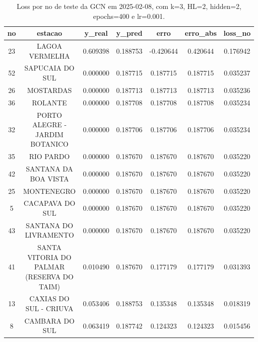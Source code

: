 \begin{table}[h]
\centering
\caption{Loss por no de teste da GCN em 2025-02-08, com k=3, HL=2, hidden=2, epochs=400 e lr=0.001.}
\label{tab:gcn_loss_k3_hl2_h2_e400_d20250208}
\begin{tabular}{ccccccc}
\toprule
no & estacao & y\_real & y\_pred & erro & erro\_abs & loss\_no \\
\midrule
23 & LAGOA VERMELHA & 0.609398 & 0.188753 & -0.420644 & 0.420644 & 0.176942 \\
52 & SAPUCAIA DO SUL & 0.000000 & 0.187715 & 0.187715 & 0.187715 & 0.035237 \\
26 & MOSTARDAS & 0.000000 & 0.187713 & 0.187713 & 0.187713 & 0.035236 \\
36 & ROLANTE & 0.000000 & 0.187708 & 0.187708 & 0.187708 & 0.035234 \\
32 & PORTO ALEGRE - JARDIM BOTANICO & 0.000000 & 0.187706 & 0.187706 & 0.187706 & 0.035234 \\
35 & RIO PARDO & 0.000000 & 0.187670 & 0.187670 & 0.187670 & 0.035220 \\
42 & SANTANA DA BOA VISTA & 0.000000 & 0.187670 & 0.187670 & 0.187670 & 0.035220 \\
25 & MONTENEGRO & 0.000000 & 0.187670 & 0.187670 & 0.187670 & 0.035220 \\
5 & CACAPAVA DO SUL & 0.000000 & 0.187670 & 0.187670 & 0.187670 & 0.035220 \\
43 & SANTANA DO LIVRAMENTO & 0.000000 & 0.187670 & 0.187670 & 0.187670 & 0.035220 \\
41 & SANTA VITORIA DO PALMAR (RESERVA DO TAIM) & 0.010490 & 0.187670 & 0.177179 & 0.177179 & 0.031393 \\
13 & CAXIAS DO SUL - CRIUVA & 0.053406 & 0.188753 & 0.135348 & 0.135348 & 0.018319 \\
8 & CAMBARA DO SUL & 0.063419 & 0.187742 & 0.124323 & 0.124323 & 0.015456 \\
\bottomrule
\end{tabular}
\end{table}
